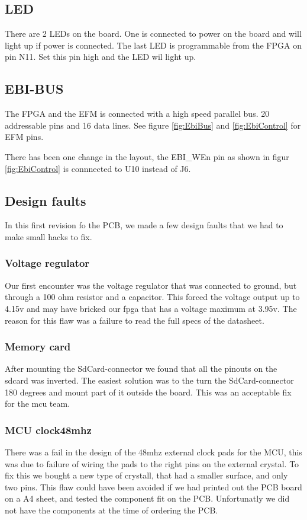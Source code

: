 \subsection{LED}
There are 2 LEDs on the board.
One is connected to power on the board and will light up if power is connected.
The last LED is programmable from the FPGA on pin N11.
Set this pin high and the LED wil light up.

\subsection{EBI-BUS}
The FPGA and the EFM is connected with a high speed parallel bus.
20 addressable pins and 16 data lines.
See figure \ref{fig:EbiBus} and \ref{fig:EbiControl} for EFM pins.

There has been one change in the layout, the EBI\_WEn pin as shown in figur \ref{fig:EbiControl} is connnected to U10 instead of J6.

\subsection{Design faults}
In this first revision fo the PCB, we made a few design faults that we had to make small hacks to fix.

\subsubsection{Voltage regulator}
Our first encounter was the voltage regulator that was connected to ground, but through a 100 ohm resistor and a capacitor.
This forced the voltage output up to 4.15v and may have bricked our fpga that has a voltage maximum at 3.95v.
The reason for this flaw was a failure to read the full specs of the datasheet.

\subsubsection{Memory card}
After mounting the SdCard-connector we found that all the pinouts on the sdcard was inverted.
The easiest solution was to the turn the SdCard-connector 180 degrees and mount part of it outside the board.
This was an acceptable fix for the mcu team.

\subsubsection{MCU clock48mhz}
There was a fail in the design of the 48mhz external clock pads for the MCU, this was due to failure of wiring the pads to the right pins on the external crystal.
To fix this we bought a new type of crystall, that had a smaller surface, and only two pins.
This flaw could have been avoided if we had printed out the PCB board on a A4 sheet, and tested the component fit on the PCB.
Unfortunatly we did not have the components at the time of ordering the PCB.

